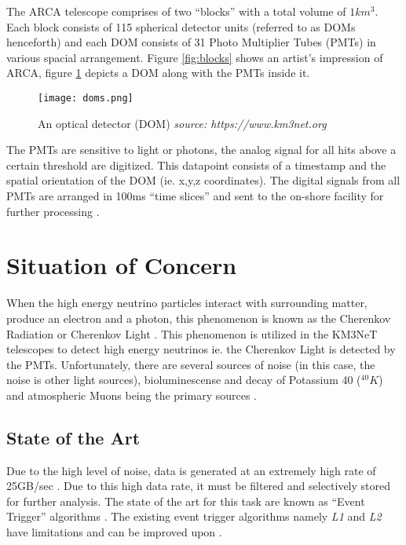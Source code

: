 The ARCA telescope comprises of two ``blocks'' with a total volume of
$1km^{3}$. Each block consists of 115 spherical detector units (referred to as
DOMs henceforth) and each DOM consists of 31 Photo Multiplier Tubes (PMTs) in
various spacial arrangement. Figure \ref{fig:blocks} shows an artist's
impression of ARCA, figure \ref{fig:doms} depicts a DOM along with the PMTs
inside it.

\begin{figure}[h]
  \centering
  \texttt{[image: doms.png]}
  \caption{An optical detector (DOM) \textit{source: https://www.km3net.org}}%
  \label{fig:doms}
\end{figure}

The PMTs are sensitive to light or photons, the analog signal for all hits
above a certain threshold are digitized. This datapoint consists of a timestamp
and the spatial orientation of the DOM (ie. x,y,z coordinates). The digital
signals from all PMTs are arranged in 100ms ``time slices'' and sent to the
on-shore facility for further processing \cite{aiello2019km3net}.

\section{Situation of Concern}

When the high energy neutrino particles interact with surrounding matter,
produce an electron and a photon, this phenomenon is known as the Cherenkov
Radiation or Cherenkov Light \cite{margiotta2014km3net}. This phenomenon is
utilized in the KM3NeT telescopes to detect high energy neutrinos ie. the
Cherenkov Light is detected by the PMTs. Unfortunately, there are several
sources of noise (in this case, the noise is other light sources),
bioluminescense and decay of Potassium 40 ($^{40}K$) and atmospheric Muons being
the primary sources \cite{post2019km3nnet}.

\subsection{State of the Art}\label{state-of-the-art}

Due to the high level of noise, data is generated at an extremely high rate of
25GB/sec \cite{adrian2016letter}. Due to this high data rate, it must be
filtered and selectively stored for further analysis. The state of the art for
this task are known as ``Event Trigger'' algorithms
\cite{adrian2016letter,aiello2019km3net}. The existing event trigger algorithms
namely \emph{L1} and \emph{L2} have limitations and can be improved upon
\cite{karas2019data}.

